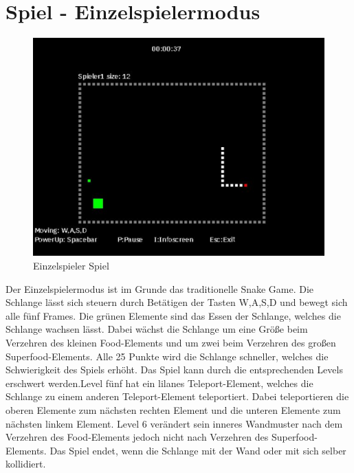 \section{Spiel - Einzelspielermodus}
\label{Spiel_-_Einzelspielermodus}
%
\begin{figure}[h]
 \centering
 \includegraphics[scale=0.5]{bilder/Einzelspielermodus}
 \caption{Einzelspieler Spiel}
 \label{fig:einzelspielermodus}
\end{figure}
	Der Einzelspielermodus ist im Grunde das traditionelle Snake Game. Die Schlange l{\"a}sst sich steuern durch Bet{\"a}tigen der Tasten W,A,S,D und bewegt sich alle f{\"u}nf Frames. Die gr{\"u}nen Elemente sind das Essen der Schlange, welches die Schlange wachsen l{\"a}sst. Dabei w{\"a}chst die Schlange um eine Gr{\"o}{\ss}e beim Verzehren des kleinen Food-Elements und um zwei beim Verzehren des gro{\ss}en Superfood-Elements. Alle 25 Punkte wird die Schlange schneller, welches die Schwierigkeit des Spiels erhöht.
	Das Spiel kann durch die entsprechenden Levels erschwert werden.Level f{\"u}nf hat ein lilanes Teleport-Element, welches die Schlange zu einem anderen Teleport-Element teleportiert. Dabei teleportieren die oberen Elemente zum n{\"a}chsten rechten Element und die unteren Elemente zum n{\"a}chsten linkem Element. Level 6 ver{\"a}ndert sein inneres Wandmuster nach dem Verzehren des Food-Elements jedoch nicht nach Verzehren des Superfood-Elements. Das Spiel endet, wenn die Schlange mit der Wand oder mit sich selber kollidiert.   


